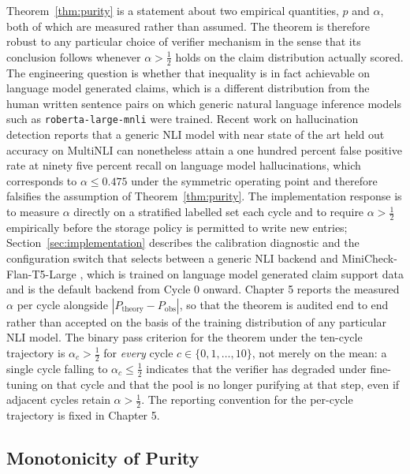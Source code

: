 \begin{remark}
\label{rem:alpha-empirical-scope}
Theorem~\ref{thm:purity} is a statement about two empirical quantities, $p$ and $\alpha$, both of which are measured rather than assumed. The theorem is therefore robust to any particular choice of verifier mechanism in the sense that its conclusion follows whenever $\alpha > \tfrac{1}{2}$ holds on the claim distribution actually scored. The engineering question is whether that inequality is in fact achievable on language model generated claims, which is a different distribution from the human written sentence pairs on which generic natural language inference models such as \texttt{roberta-large-mnli} were trained. Recent work on hallucination detection \citep{semanticillusion2025} reports that a generic NLI model with near state of the art held out accuracy on MultiNLI can nonetheless attain a one hundred percent false positive rate at ninety five percent recall on language model hallucinations, which corresponds to $\alpha \le 0.475$ under the symmetric operating point and therefore falsifies the assumption of Theorem~\ref{thm:purity}. The implementation response is to measure $\alpha$ directly on a stratified labelled set each cycle and to require $\alpha > \tfrac{1}{2}$ empirically before the storage policy is permitted to write new entries; Section~\ref{sec:implementation} describes the calibration diagnostic and the configuration switch that selects between a generic NLI backend and MiniCheck-Flan-T5-Large \citep{tang2024minicheck}, which is trained on language model generated claim support data and is the default backend from Cycle 0 onward. Chapter 5 reports the measured $\alpha$ per cycle alongside $|P_{\text{theory}} - P_{\text{obs}}|$, so that the theorem is audited end to end rather than accepted on the basis of the training distribution of any particular NLI model. The binary pass criterion for the theorem under the ten-cycle trajectory is $\alpha_c > \tfrac{1}{2}$ for \emph{every} cycle $c \in \{0, 1, \ldots, 10\}$, not merely on the mean: a single cycle falling to $\alpha_c \le \tfrac{1}{2}$ indicates that the verifier has degraded under fine-tuning on that cycle and that the pool is no longer purifying at that step, even if adjacent cycles retain $\alpha > \tfrac{1}{2}$. The reporting convention for the per-cycle trajectory is fixed in Chapter 5.
\end{remark}

\subsection{Monotonicity of Purity}
\label{sec:monotonicity-theorem}

